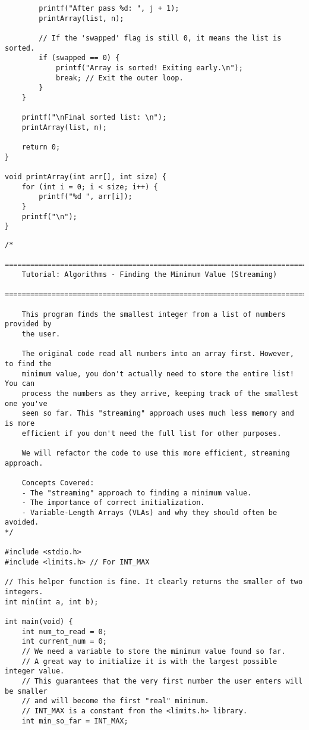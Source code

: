 \documentclass[11pt]{book}
\begin{document}
\begin{verbatim}
        printf("After pass %d: ", j + 1);
        printArray(list, n);

        // If the 'swapped' flag is still 0, it means the list is sorted.
        if (swapped == 0) {
            printf("Array is sorted! Exiting early.\n");
            break; // Exit the outer loop.
        }
    }

    printf("\nFinal sorted list: \n");
    printArray(list, n);

    return 0;
}

void printArray(int arr[], int size) {
    for (int i = 0; i < size; i++) {
        printf("%d ", arr[i]);
    }
    printf("\n");
}

\end{verbatim}
\clearpage
\begin{verbatim}
/*
    ================================================================================
    Tutorial: Algorithms - Finding the Minimum Value (Streaming)
    ================================================================================

    This program finds the smallest integer from a list of numbers provided by
    the user.

    The original code read all numbers into an array first. However, to find the
    minimum value, you don't actually need to store the entire list! You can
    process the numbers as they arrive, keeping track of the smallest one you've
    seen so far. This "streaming" approach uses much less memory and is more
    efficient if you don't need the full list for other purposes.

    We will refactor the code to use this more efficient, streaming approach.

    Concepts Covered:
    - The "streaming" approach to finding a minimum value.
    - The importance of correct initialization.
    - Variable-Length Arrays (VLAs) and why they should often be avoided.
*/

#include <stdio.h>
#include <limits.h> // For INT_MAX

// This helper function is fine. It clearly returns the smaller of two integers.
int min(int a, int b);

int main(void) {
    int num_to_read = 0;
    int current_num = 0;
    // We need a variable to store the minimum value found so far.
    // A great way to initialize it is with the largest possible integer value.
    // This guarantees that the very first number the user enters will be smaller
    // and will become the first "real" minimum.
    // INT_MAX is a constant from the <limits.h> library.
    int min_so_far = INT_MAX;


\end{verbatim}
\end{document}
